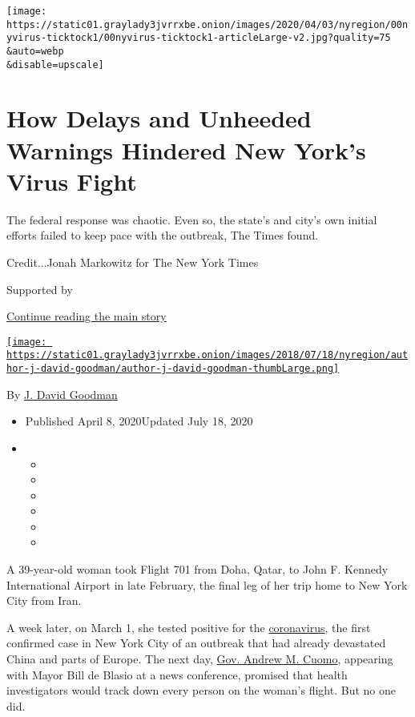 \texttt{[image: https://static01.graylady3jvrrxbe.onion/images/2020/04/03/nyregion/00nyvirus-ticktock1/00nyvirus-ticktock1-articleLarge-v2.jpg?quality=75\\\&auto=webp\\\&disable=upscale]}

\hypertarget{how-delays-and-unheeded-warnings-hindered-new-yorks-virus-fight}{%
\section{How Delays and Unheeded Warnings Hindered New York's Virus
Fight}\label{how-delays-and-unheeded-warnings-hindered-new-yorks-virus-fight}}

The federal response was chaotic. Even so, the state's and city's own
initial efforts failed to keep pace with the outbreak, The Times found.

Credit...Jonah Markowitz for The New York Times

Supported by

\protect\hyperlink{after-sponsor}{Continue reading the main story}

\href{https://www.nytimes3xbfgragh.onion/by/j-david-goodman}{\texttt{[image: https://static01.graylady3jvrrxbe.onion/images/2018/07/18/nyregion/author-j-david-goodman/author-j-david-goodman-thumbLarge.png]}}

By \href{https://www.nytimes3xbfgragh.onion/by/j-david-goodman}{J. David
Goodman}

\begin{itemize}
\item
  Published April 8, 2020Updated July 18, 2020
\item
  \begin{itemize}
  \item
  \item
  \item
  \item
  \item
  \item
  \end{itemize}
\end{itemize}

A 39-year-old woman took Flight 701 from Doha, Qatar, to John F. Kennedy
International Airport in late February, the final leg of her trip home
to New York City from Iran.

A week later, on March 1, she tested positive for the
\href{https://www.nytimes3xbfgragh.onion/2020/07/13/upshot/coronavirus-response-fax-machines.html}{coronavirus},
the first confirmed case in New York City of an outbreak that had
already devastated China and parts of Europe. The next day,
\href{https://www.nytimes3xbfgragh.onion/2020/04/09/style/cuomo-ny-tough-video-coronavirus.html}{Gov.
Andrew M. Cuomo}, appearing with Mayor Bill de Blasio at a news
conference, promised that health investigators would track down every
person on the woman's flight. But no one did.

